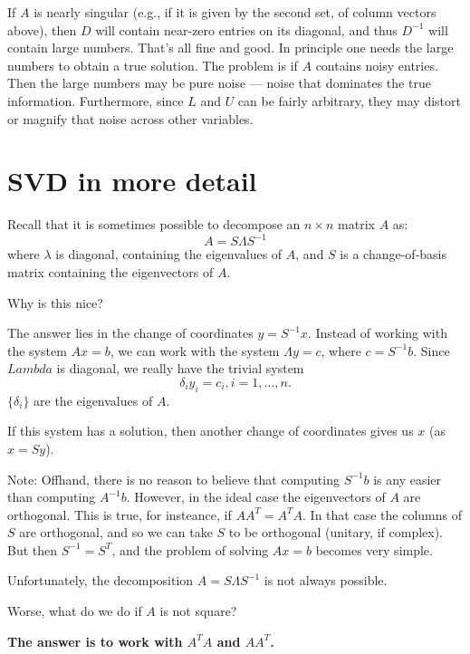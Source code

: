 \begin{enumerate}[label=(\roman*)]
\begin{enumerate}
        If $A$ is nearly singular (e.g., if it is given by the second set, of column vectors above), then $D$ will contain near-zero entries on its diagonal, and thus $D^{-1}$ will contain large numbers. That's all fine and good. In principle one needs the large numbers to obtain a true solution. The problem is if $A$ contains noisy entries. Then the large numbers may be pure noise --- noise that dominates the true information. Furthermore, since $L$ and $U$ can be fairly arbitrary, they may distort or magnify that noise across other variables. 
    \end{enumerate}
    
\end{enumerate}



\section{SVD in more detail}

Recall that it is sometimes possible to decompose an $n \times n$ matrix $A$ as: 
\[
    A = S \Lambda S^{-1}
\]
where $\lambda$ is diagonal, containing the eigenvalues of $A$, and $S$ is a change-of-basis matrix containing the eigenvectors of $A$.

Why is this nice? 

The answer lies in the change of coordinates $y= S^{-1}x$. Instead of working with the system $Ax=b$, we can work with the system $\Lambda y = c$, where $c = S^{-1}b$. Since $Lambda$ is diagonal, we really have the trivial system
\[
    \delta_i y_i = c_i, i=1,\dots, n.
\]
$\{ \delta_i \}$ are the eigenvalues of $A$.

If this system has a solution, then another change of coordinates gives us $x$ (as $x = Sy$).

Note: Offhand, there is no reason to believe that computing $S^{-1}b$ is any easier than computing $A^{-1}b$. However, in the ideal case the eigenvectors of $A$ are orthogonal. This is true, for insteance, if $AA^T = A^TA$. In that case the columns of $S$ are orthogonal, and so we can take $S$ to be orthogonal (unitary, if complex). But then $S^{-1}=S^T$, and the problem of solving $Ax=b$ becomes very simple. 

Unfortunately, the decomposition $A=S \Lambda S^{-1}$ is not always possible. 

Worse, what do we do if $A$ is not square?

\textbf{The answer is to work with $A^TA$ and $AA^T$.}

